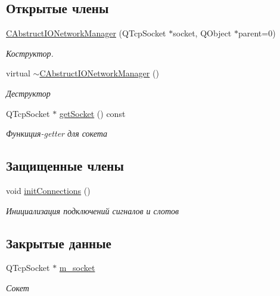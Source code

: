 \subsection*{Открытые члены}
\begin{DoxyCompactItemize}
\item 
\hyperlink{class_c_abstruct_i_o_network_manager_a4ed201a3712ddf4ccd2135a0eb40fbf2}{C\+Abstruct\+I\+O\+Network\+Manager} (Q\+Tcp\+Socket $\ast$socket, Q\+Object $\ast$parent=0)
\begin{DoxyCompactList}\small\item\em Коструктор. \end{DoxyCompactList}\item 
virtual \hyperlink{class_c_abstruct_i_o_network_manager_ae6a3817e290e0ff8fcbf3d4c6830f5cd}{$\sim$\+C\+Abstruct\+I\+O\+Network\+Manager} ()
\begin{DoxyCompactList}\small\item\em Деструктор \end{DoxyCompactList}\item 
Q\+Tcp\+Socket $\ast$ \hyperlink{class_c_abstruct_i_o_network_manager_a118a2c8254c149614cba51c42147c709}{get\+Socket} () const
\begin{DoxyCompactList}\small\item\em Функиция-\/getter для сокета \end{DoxyCompactList}\end{DoxyCompactItemize}
\subsection*{Защищенные члены}
\begin{DoxyCompactItemize}
\item 
void \hyperlink{class_c_abstruct_i_o_network_manager_ac01bfefacfa37050c8d3a9317a38fbf5}{init\+Connections} ()
\begin{DoxyCompactList}\small\item\em Инициализация подключений сигналов и слотов \end{DoxyCompactList}\end{DoxyCompactItemize}
\subsection*{Закрытые данные}
\begin{DoxyCompactItemize}
\item 
Q\+Tcp\+Socket $\ast$ \hyperlink{class_c_abstruct_i_o_network_manager_a0c8754d8191c83c660f43b8c89e39d4e}{m\+\_\+socket}
\begin{DoxyCompactList}\small\item\em Сокет \end{DoxyCompactList}\end{DoxyCompactItemize}


